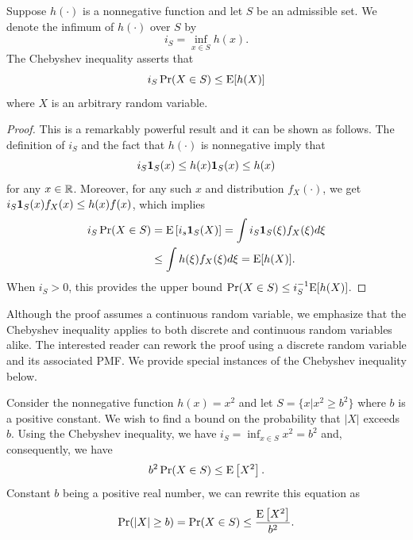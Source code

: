 \begin{proposition}
Suppose $h (\cdot)$ is a nonnegative function and let $S$ be an admissible set.
We denote the infimum of $h (\cdot)$ over $S$ by
\begin{equation*}
i_S = \inf_{ x \in S } h (x) .
\end{equation*}
The Chebyshev inequality asserts that
\begin{equation} \label{equation:ChebyshevInequality}
i_S \Pr (X \in S)
\leq \mathrm{E} [ h(X) ]
\end{equation}
where $X$ is an arbitrary random variable.
\end{proposition}
\begin{proof}
This is a remarkably powerful result and it can be shown as follows.
The definition of $i_S$ and the fact that $h (\cdot)$ is nonnegative imply that
\begin{equation*}
i_S \mathbf{1}_S (x) \leq h(x) \mathbf{1}_S (x) \leq h(x)
\end{equation*}
for any $x \in \mathbb{R}$.
Moreover, for any such $x$ and distribution $f_X(\cdot)$, we get $i_S \mathbf{1}_S (x) f_X(x) \leq h(x) f(x)$, which implies
\begin{equation*}
\begin{split}
i_S \Pr (X \in S) &= \mathrm{E} \left[ i_s \mathbf{1}_S (X) \right]
= \int i_S \mathbf{1}_S (\xi) f_X(\xi) d\xi \\
&\leq \int h (\xi) f_X(\xi) d\xi
= \mathrm{E} [ h(X) ] .
\end{split}
\end{equation*}
When $i_S > 0$, this provides the upper bound $\Pr (X \in S) \leq i_S^{-1} \mathrm{E} [h (X)]$.
\end{proof}

Although the proof assumes a continuous random variable, we emphasize that the Chebyshev inequality applies to both discrete and continuous random variables alike.
The interested reader can rework the proof using a discrete random variable and its associated PMF.
We provide special instances of the Chebyshev inequality below.

\begin{example}
Consider the nonnegative function $h(x) = x^2$ and let $S = \{ x | x^2 \geq b^2 \}$ where $b$ is a positive constant.
We wish to find a bound on the probability that $|X|$ exceeds $b$.
Using the Chebyshev inequality, we have $i_S = \inf_{x \in S} x^2 = b^2$ and, consequently, we have
\begin{equation*}
b^2 \Pr (X \in S) \leq \mathrm{E} \left[ X^2 \right] .
\end{equation*}
Constant $b$ being a positive real number, we can rewrite this equation as
\begin{equation*}
\Pr (|X| \geq b) = \Pr (X \in S) \leq \frac{\mathrm{E} \left[ X^2 \right]}{b^2} .
\end{equation*}
\end{example}

